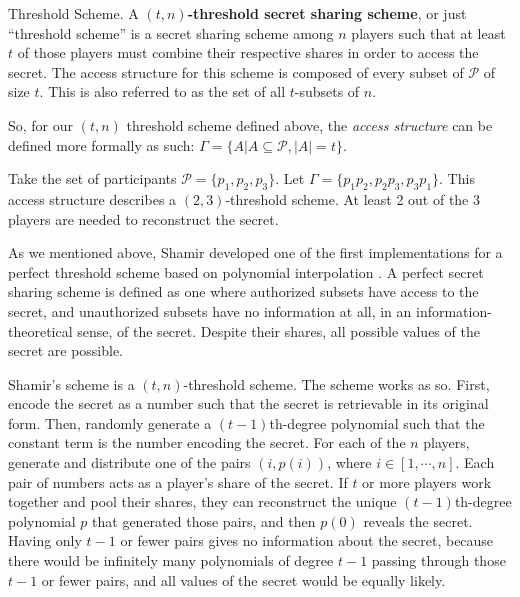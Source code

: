 \begin{definition}{Threshold Scheme.}
    \label{defn:threshold-scheme}
    A \textbf{$(t,n)$-threshold secret sharing scheme}, or just ``threshold scheme'' is a secret sharing scheme among $n$ players such that at least $t$ of those players must combine their respective shares in order to access the secret. The access structure for this scheme is composed of every subset of $\mathcal{P}$ of size $t$. This is also referred to as the set of all $t$-subsets of $n$.
\end{definition}

So, for our $(t,n)$ threshold scheme defined above, the \textit{access structure} can be defined more formally as such: $\Gamma = \{A | A \subseteq \mathcal{P} , |A| = t\}$.

\begin{example}
    Take the set of participants $\mathcal{P} = \{p_1,p_2,p_3\}$. Let $\Gamma = \{p_1p_2,p_2p_3,p_3p_1\}$. This access structure describes a $(2,3)$-threshold scheme. At least 2 out of the 3 players are needed to reconstruct the secret.
\end{example}

As we mentioned above, Shamir developed one of the first implementations for a perfect threshold scheme based on polynomial interpolation \cite{shamir_how_1979}. A perfect secret sharing scheme is defined as one where authorized subsets have access to the secret, and unauthorized subsets have no information at all, in an information-theoretical sense, of the secret. Despite their shares, all possible values of the secret are possible.

Shamir's scheme is a $(t,n)$-threshold scheme. The scheme works as so. First, encode the secret as a number such that the secret is retrievable in its original form. Then, randomly generate a $(t-1)$th-degree polynomial such that the constant term is the number encoding the secret. For each of the $n$ players, generate and distribute one of the pairs $(i, p(i))$, where $i \in [1, \cdots, n]$. Each pair of numbers acts as a player's share of the secret. If $t$ or more players work together and pool their shares, they can reconstruct the unique $(t-1)$th-degree polynomial $p$ that generated those pairs, and then $p(0)$ reveals the secret. Having only $t-1$ or fewer pairs gives no information about the secret, because there would be infinitely many polynomials of degree $t-1$ passing through those $t-1$ or fewer pairs, and all values of the secret would be equally likely.

